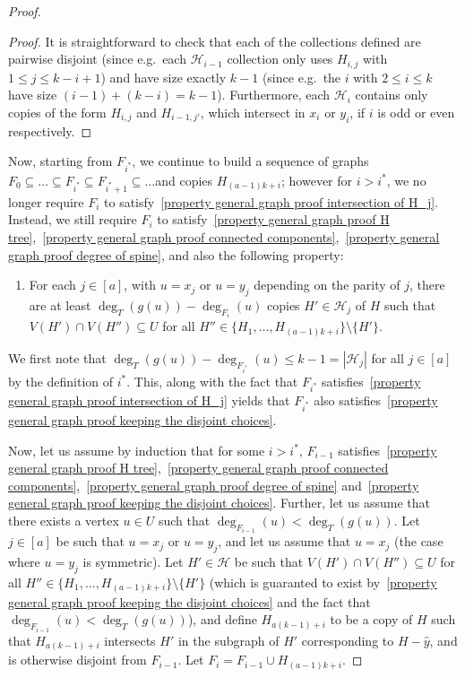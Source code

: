 \documentclass[12pt,letterpaper]{article}
\theoremstyle{definition}
\renewcommand{\c}[1]{\mathcal{#1}}
\begin{document}
\begin{proof}
\begin{proof}
			It is straightforward to check that each of the collections defined are pairwise disjoint (since e.g.\ each $\c{H}_{i-1}$ collection only uses $H_{i,j}$ with $1\le j \le k-i+1$) and have size exactly $k-1$ (since e.g.\ the $i$ with $2\le i\le k$ have size $(i-1)+(k-i)=k-1$). Furthermore, each $\mathcal{H}_i$ contains only copies of the form $H_{i,j}$ and $H_{i-1,j'}$, which intersect in $x_i$ or $y_i$, if $i$ is odd or even respectively.
		\end{proof}
		
		Now, starting from $F_{i^*}$, we continue to build a sequence of graphs $F_0\subseteq \dots\subseteq F_{i^*}\subseteq F_{i^*+1}\subseteq\dots$and copies $H_{(a-1)k+i}$; however for $i>i^*$, we no longer require $F_i$ to satisfy~\ref{property general graph proof intersection of H_j}. Instead, we still require $F_i$ to satisfy~\ref{property general graph proof H tree},~\ref{property general graph proof connected components},~\ref{property general graph proof degree of spine}, and also the following property:
		
		\begin{enumerate}[label=(G\arabic*), start=5]
			\item For each $j\in [a]$, with $u=x_j$ or $u=y_j$ depending on the parity of $j$, there are at least $\deg_T(g(u))-\deg_{F_i}(u)$ copies $H'\in \mathcal{H}_j$ of $H$ such that $V(H')\cap V(H'')\subseteq U$ for all $H''\in \{H_1,\dots,H_{(a-1)k+i}\}\setminus\{H'\}$.\label{property general graph proof keeping the disjoint choices}
		\end{enumerate}
		
		We first note that $\deg_T(g(u))-\deg_{F_{i^*}}(u)\leq k-1=|\mathcal{H}_j|$ for all $j\in [a]$ by the definition of $i^*$. This, along with the fact that $F_{i^*}$ satisfies~\ref{property general graph proof intersection of H_j} yields that $F_{i^*}$ also satisfies~\ref{property general graph proof keeping the disjoint choices}.
		
		Now, let us assume by induction that for some $i>i^*$, $F_{i-1}$ satisfies~\ref{property general graph proof H tree},~\ref{property general graph proof connected components},~\ref{property general graph proof degree of spine} and~\ref{property general graph proof keeping the disjoint choices}. Further, let us assume that there exists a vertex $u\in U$ such that $\deg_{F_{i-1}}(u)<\deg_{T}(g(u))$. Let $j\in [a]$ be such that $u=x_j$ or $u=y_j$, and let us assume that $u=x_j$ (the case where $u=y_j$ is symmetric). Let $H'\in \mathcal{H}$ be such that $V(H')\cap V(H'')\subseteq U$ for all $H''\in \{H_1,\dots,H_{(a-1)k+i}\}\setminus\{H'\}$ (which is guaranted to exist by~\ref{property general graph proof keeping the disjoint choices} and the fact that $\deg_{F_{i-1}}(u)<\deg_{T}(g(u))$), and define $H_{a(k-1)+i}$ to be a copy of $H$ such that $H_{a(k-1)+i}$ intersects $H'$ in the subgraph of $H'$ corresponding to $H-\hat{y}$, and is otherwise disjoint from $F_{i-1}$. Let $F_i=F_{i-1}\cup H_{(a-1)k+i}$.
		

\end{proof}
\end{document}
